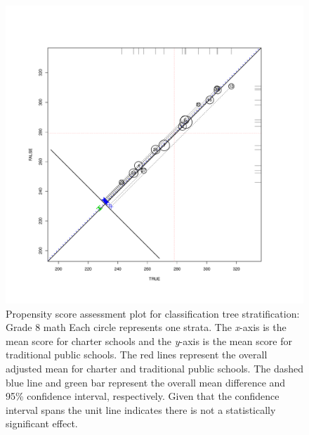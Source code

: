 \begin{figure}
\begin{center}
\includegraphics[trim=0 .7in 0 .7in]{../Figures2009/g8math-circpsa-tree.pdf}
\caption[Propensity score assessment plot for classification tree stratification: Grade 8 math]{Propensity score assessment plot for classification tree stratification: Grade 8 math Each circle represents one strata. The \textit{x}-axis is the mean score for charter schools and the \textit{y}-axis is the mean score for traditional public schools. The red lines represent the overall adjusted mean for charter and traditional public schools. The dashed blue line and green bar represent the overall mean difference and 95\% confidence interval, respectively. Given that the confidence interval spans the unit line indicates there is not a statistically significant effect.}
\end{center}
\end{figure}

\clearpage



